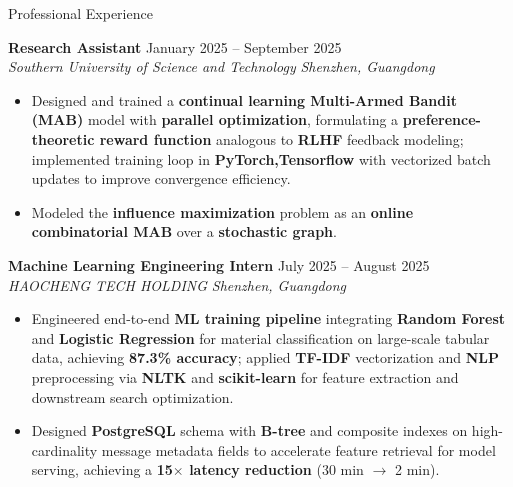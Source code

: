 \begin{rSection}{Professional Experience}
    \setlength{\parskip}{1pt}
    \setlength{\baselineskip}{3pt}

\textbf{Research Assistant} \hfill January 2025 -- September 2025 \\
\textit{Southern University of Science and Technology} \hfill \textit{Shenzhen, Guangdong}
\begin{itemize}
\vspace{-5pt}
    \item Designed and trained a \textbf{continual learning Multi-Armed Bandit (MAB)} model with \textbf{parallel optimization}, formulating a \textbf{preference-theoretic reward function} analogous to \textbf{RLHF} feedback modeling; implemented training loop in \textbf{PyTorch,Tensorflow} with vectorized batch updates to improve convergence efficiency.
    \item Modeled the \textbf{influence maximization} problem as an \textbf{online combinatorial MAB} over a \textbf{stochastic graph}.
\end{itemize}

\textbf{Machine Learning Engineering Intern} \hfill July 2025 -- August 2025 \\
\textit{HAOCHENG TECH HOLDING} \hfill \textit{Shenzhen, Guangdong}
\begin{itemize}
\vspace{-5pt}
    \item Engineered end-to-end \textbf{ML training pipeline} integrating \textbf{Random Forest} and \textbf{Logistic Regression} for material classification on large-scale tabular data, achieving \textbf{87.3\% accuracy}; applied \textbf{TF-IDF} vectorization and \textbf{NLP} preprocessing via \textbf{NLTK} and \textbf{scikit-learn} for feature extraction and downstream search optimization.
    \item Designed \textbf{PostgreSQL} schema with \textbf{B-tree} and composite indexes on high-cardinality message metadata fields to accelerate feature retrieval for model serving, achieving a \textbf{15$\times$ latency reduction} (30 min $\rightarrow$ 2 min).
    
\end{itemize}


\end{rSection}
